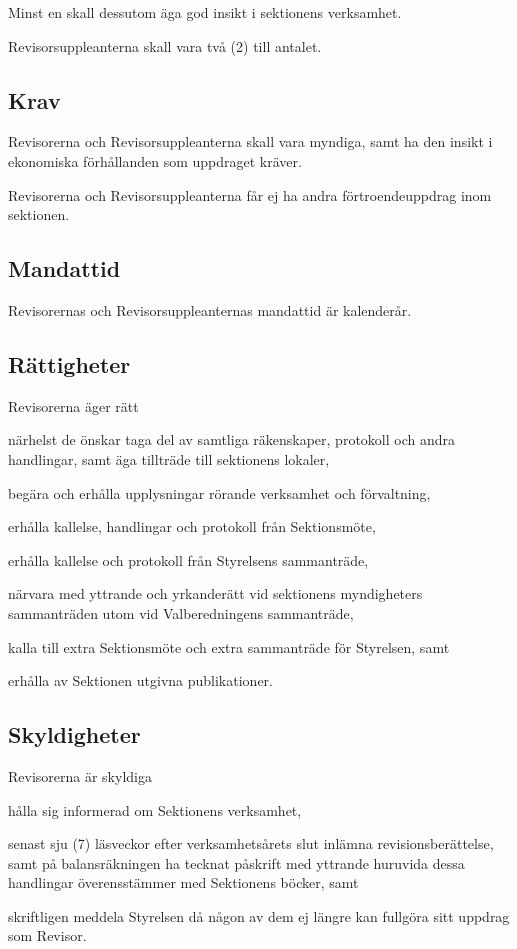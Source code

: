\documentclass[10pt]{article}
\begin{document}
    Minst en skall dessutom äga god insikt i sektionens verksamhet.
    
    Revisorsuppleanterna skall vara två (2) till antalet.
    
    \subsection{Krav}
    Revisorerna och Revisorsuppleanterna skall vara myndiga, samt ha den insikt i
    ekonomiska förhållanden som uppdraget kräver.
    
    Revisorerna och Revisorsuppleanterna får ej ha andra förtroendeuppdrag inom
    sektionen.
    
    \subsection{Mandattid}
    Revisorernas och Revisorsuppleanternas mandattid är kalenderår.
    
    \subsection{Rättigheter}
    Revisorerna äger rätt
    \begin{attlist}
    \item närhelst de önskar taga del av samtliga räkenskaper, protokoll och
        andra handlingar, samt äga tillträde till sektionens lokaler,
    \item begära och erhålla upplysningar rörande verksamhet och förvaltning,
    \item erhålla kallelse, handlingar och protokoll från Sektionsmöte,
    \item erhålla kallelse och protokoll från Styrelsens sammanträde,
    \item närvara med yttrande och yrkanderätt vid sektionens myndigheters
        sammanträden utom vid Valberedningens sammanträde,
    \item kalla till extra Sektionsmöte och extra sammanträde för Styrelsen, samt
    \item erhålla av Sektionen utgivna publikationer.
    \end{attlist}
    
    \subsection{Skyldigheter}
    Revisorerna är skyldiga
    \begin{attlist}
    \item hålla sig informerad om Sektionens verksamhet,
    \item senast sju (7) läsveckor efter verksamhetsårets slut inlämna
        revisionsberättelse, samt på balansräkningen ha tecknat påskrift med
        yttrande huruvida dessa handlingar överensstämmer med Sektionens böcker,
        samt
    \item skriftligen meddela Styrelsen då någon av dem ej längre kan fullgöra
        sitt uppdrag som Revisor.
    \end{attlist}
    
\end{document}
